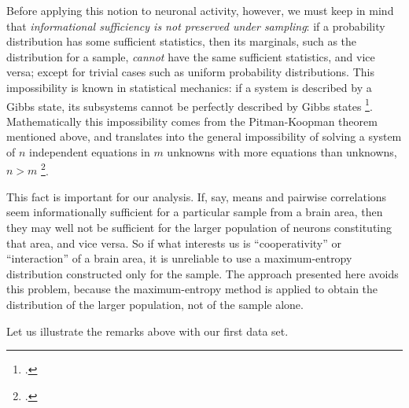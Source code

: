 \documentclass[\ifafour a4paper,12pt,\else a5paper,10pt,\fi%
onecolumn,oneside,article,%
british%
]{memoir}
\theoremstyle{remark}
\theoremstyle{innote}
\newcommand*{\citep}{\footcites}
\renewcommand*{\|}{\nonscript\,\vert\nonscript\;\mathopen{}}
\newcommand*{\sect}{\S}%
\newcommand*{\eg}{{e.g.}}
\begin{document}
Before applying this notion to neuronal activity, however, we must keep in
mind that \emph{informational sufficiency is not preserved under sampling}:
if a probability distribution has some sufficient statistics, then its
marginals, such as the distribution for a sample, \emph{cannot} have the
same sufficient statistics, and vice versa; except for trivial cases such
as uniform probability distributions. %
This impossibility is known in statistical mechanics: if a system is
described by a Gibbs state, its subsystems cannot be perfectly described by
Gibbs states \citep[\eg][and references therein]{maesetal1999}.
Mathematically this impossibility comes from the Pitman-Koopman theorem
mentioned above, and translates into the general impossibility of solving a
system of $n$ independent equations in $m$ unknowns with more equations
than unknowns, $n>m$ \citep[\sect~3.1]{portamanaetal2015}.

This fact is important for our analysis. If, say, means and pairwise
correlations seem informationally sufficient for a particular sample from a
brain area, then they may well not be sufficient for the larger population of
neurons constituting that area, and vice versa. So if what interests us is
\enquote{cooperativity} or \enquote{interaction} of a brain area, it is
unreliable to use a maximum-entropy distribution constructed only for the
sample. %
The approach presented here avoids this problem, because the
maximum-entropy method is applied to obtain the distribution of the larger
population, not of the sample alone.

\bigskip

Let us illustrate the remarks above with our first data set.
\end{document}
